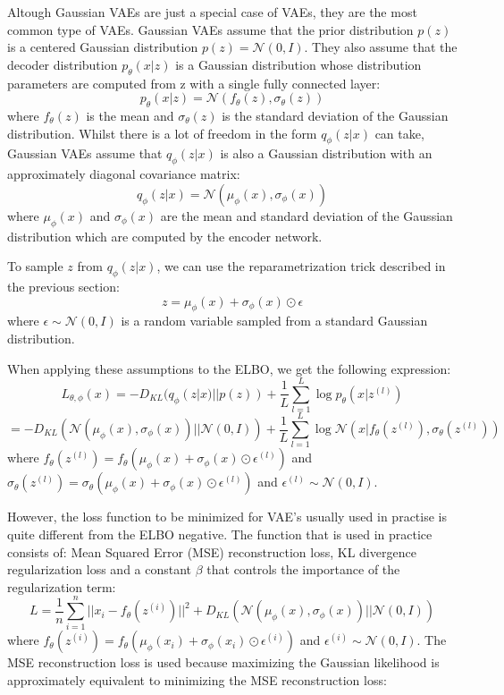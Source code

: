 Altough Gaussian VAEs are just a special case of VAEs, they are the most common type of VAEs. Gaussian VAEs assume that the prior distribution $p(z)$ is a centered Gaussian distribution $ p(z) = \mathcal{N}(0, I)$. They also assume that the decoder distribution $p_{\theta}(x|z)$ is a Gaussian distribution whose distribution parameters are computed from z with a single fully connected layer: 
\[ p_{\theta}(x|z) = \mathcal{N}(f_{\theta}(z), \sigma_{\theta}(z)) \]
where $f_{\theta}(z)$ is the mean and $\sigma_{\theta}(z)$ is the standard deviation of the Gaussian distribution. Whilst there is a lot of freedom in the form $q_{\phi}(z|x)$ can take, Gaussian VAEs assume that $q_{\phi}(z|x)$ is also a Gaussian distribution with an approximately diagonal covariance matrix: 
\[ q_{\phi}(z|x) = \mathcal{N}(\mu_{\phi}(x), \sigma_{\phi}(x)) \]
where $\mu_{\phi}(x)$ and $\sigma_{\phi}(x)$ are the mean and standard deviation of the Gaussian distribution which are computed by the encoder network.

To sample $z$ from $q_{\phi}(z|x)$, we can use the reparametrization trick described in the previous section: \[ z = \mu_{\phi}(x) + \sigma_{\phi}(x) \odot \epsilon \] where $\epsilon \sim \mathcal{N}(0, I)$ is a random variable sampled from a standard Gaussian distribution.

When applying these assumptions to the ELBO, we get the following expression: \[ L_{\theta, \phi}(x) = - D_{KL}(q_{\phi}(z|x) || p(z)) + \frac{1}{L} \sum_{l=1}^{L} \log p_{\theta}(x|z^{(l)}) \]
\[ = - D_{KL}(\mathcal{N}(\mu_{\phi}(x), \sigma_{\phi}(x)) || \mathcal{N}(0, I)) + \frac{1}{L} \sum_{l=1}^{L} \log \mathcal{N}(x|f_{\theta}(z^{(l)}), \sigma_{\theta}(z^{(l)})) \]
where $f_{\theta}(z^{(l)}) = f_{\theta}(\mu_{\phi}(x) + \sigma_{\phi}(x) \odot \epsilon^{(l)})$ and $\sigma_{\theta}(z^{(l)}) = \sigma_{\theta}(\mu_{\phi}(x) + \sigma_{\phi}(x) \odot \epsilon^{(l)})$ and $\epsilon^{(l)} \sim \mathcal{N}(0, I)$.

However, the loss function to be minimized for VAE's usually used in practise is quite different from the ELBO negative. The function that is used in practice consists of: Mean Squared Error (MSE) reconstruction loss, KL divergence regularization loss and a constant $\beta$ that controls the importance of the regularization term:
\[ L = \frac{1}{n} \sum_{i=1}^{n} ||x_i - f_{\theta}(z^{(i)}) ||^2 + D_{KL}(\mathcal{N}(\mu_{\phi}(x), \sigma_{\phi}(x)) || \mathcal{N}(0, I)) \]
where $f_{\theta}(z^{(i)}) = f_{\theta}(\mu_{\phi}(x_i) + \sigma_{\phi}(x_i) \odot \epsilon^{(i)})$ and $\epsilon^{(i)} \sim \mathcal{N}(0, I)$. The MSE reconstruction loss is used because maximizing the Gaussian likelihood is approximately equivalent to minimizing the MSE reconstruction loss:

